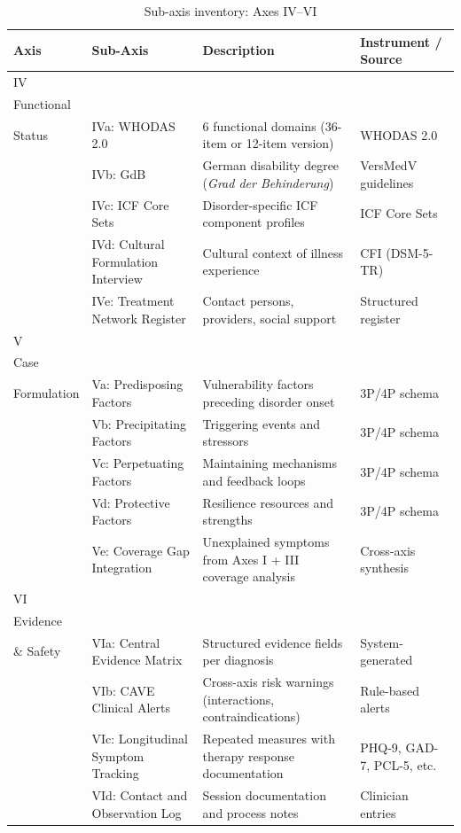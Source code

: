 \documentclass[11pt,a4paper]{article}
\newenvironment{CompactLongTable}{%
  \begingroup
  \footnotesize
  \setstretch{1.0}%
  \setlength{\LTpre}{0pt}%
  \setlength{\LTpost}{0pt}%
}{%
  \endgroup
}
\begin{document}
\begin{table}[H]
\centering
\caption{Sub-axis inventory: Axes IV--VI}
\label{tab:subaxes_part3}
\begin{CompactLongTable}
\begin{tabular}{@{}L{1.8cm}L{2.4cm}L{5.0cm}L{4.0cm}@{}}
\toprule
\textbf{Axis} & \textbf{Sub-Axis} & \textbf{Description} & \textbf{Instrument / Source} \\
\midrule
IV\\Functional\\Status & IVa: WHODAS 2.0 & 6 functional domains (36-item or 12-item version) & WHODAS 2.0 \\
 & IVb: GdB & German disability degree (\textit{Grad der Behinderung}) & VersMedV guidelines \\
 & IVc: ICF Core Sets & Disorder-specific ICF component profiles & ICF Core Sets \\
 & IVd: Cultural Formulation Interview & Cultural context of illness experience & CFI (DSM-5-TR) \\
 & IVe: Treatment Network Register & Contact persons, providers, social support & Structured register \\
\midrule
V\\Case\\Formulation & Va: Predisposing Factors & Vulnerability factors preceding disorder onset & 3P/4P schema \\
 & Vb: Precipitating Factors & Triggering events and stressors & 3P/4P schema \\
 & Vc: Perpetuating Factors & Maintaining mechanisms and feedback loops & 3P/4P schema \\
 & Vd: Protective Factors & Resilience resources and strengths & 3P/4P schema \\
 & Ve: Coverage Gap Integration & Unexplained symptoms from Axes I + III coverage analysis & Cross-axis synthesis \\
\midrule
VI\\Evidence\\\& Safety & VIa: Central Evidence Matrix & Structured evidence fields per diagnosis & System-generated \\
 & VIb: CAVE Clinical Alerts & Cross-axis risk warnings (interactions, contraindications) & Rule-based alerts \\
 & VIc: Longitudinal Symptom Tracking & Repeated measures with therapy response documentation & PHQ-9, GAD-7, PCL-5, etc. \\
 & VId: Contact and Observation Log & Session documentation and process notes & Clinician entries \\
\bottomrule
\end{tabular}
\end{CompactLongTable}
\end{table}
\end{document}
